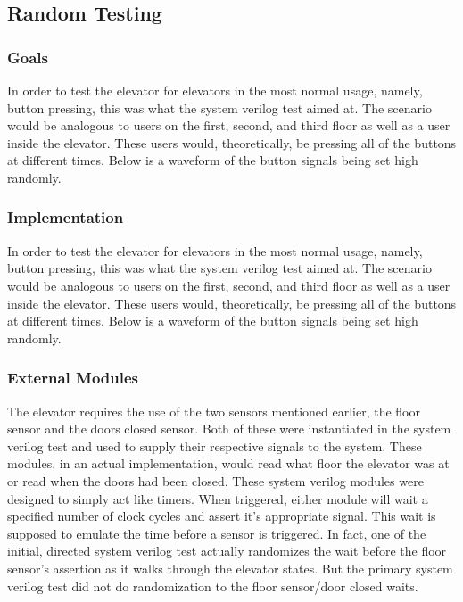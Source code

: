 \documentclass[journal]{IEEEtran}
\begin{document}
\subsection{Random Testing}

\subsubsection{Goals}
In order to test the elevator for elevators in the most normal usage, namely, button pressing, this was what the system verilog test aimed at. The scenario would be analogous to users on the first, second, and third floor as well as a user inside the elevator. These users would, theoretically, be pressing all of the buttons at different times. Below is a waveform of the button signals being set high randomly.

\subsubsection{Implementation}
In order to test the elevator for elevators in the most normal usage, namely, button pressing, this was what the system verilog test aimed at. The scenario would be analogous to users on the first, second, and third floor as well as a user inside the elevator. These users would, theoretically, be pressing all of the buttons at different times. Below is a waveform of the button signals being set high randomly.


\subsubsection{External Modules}
The elevator requires the use of the two sensors mentioned earlier, the floor sensor and the doors closed sensor. Both of these were instantiated in the system verilog test and used to supply their respective signals to the system. These modules, in an actual implementation, would read what floor the elevator was at or read when the doors had been closed. These system verilog modules were designed to simply act like timers. When triggered, either module will wait a specified number of clock cycles and assert it’s appropriate signal. This wait is supposed to emulate the time before a sensor is triggered. In fact, one of the initial, directed system verilog test actually randomizes the wait before the floor sensor’s assertion as it walks through the elevator states. But the primary system verilog test did not do randomization to the floor sensor/door closed waits.
\end{document}
